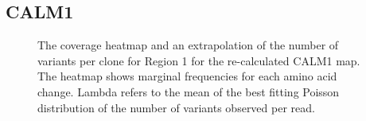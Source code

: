 \documentclass{article}
\begin{document}
\subsection{CALM1}

\begin{figure}[H]%
    \centering
    \qquad
    \caption{The coverage heatmap and an extrapolation of the number of variants per clone for Region 1 for the re-calculated CALM1 map. The heatmap shows marginal frequencies for each amino acid change. Lambda refers to the mean of the best fitting Poisson distribution of the number of variants observed per read.}%
    \label{fig:heatmap_CALM1}%
\end{figure}
\end{document}

